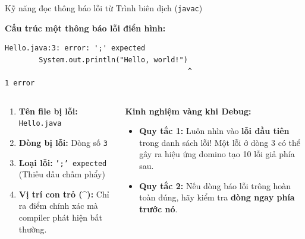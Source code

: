 \documentclass[aspectratio=169, 10pt]{beamer}
\begin{document}
\begin{frame}[fragile]{Kỹ năng đọc thông báo lỗi từ Trình biên dịch (\texttt{javac})}
  \begin{block}{\textbf{Cấu trúc một thông báo lỗi điển hình:}}
    \begin{lstlisting}[style=terminalStyle]
Hello.java:3: error: ';' expected
        System.out.println("Hello, world!")
                                           ^
1 error
    \end{lstlisting}
  \end{block}

  \begin{columns}
    \begin{tcolorbox}[colback=white,colframe=UniBlue,title=\textbf{Các thành phần của thông báo lỗi}]
      \small
      \begin{enumerate}
        \item \textbf{Tên file bị lỗi:} \texttt{Hello.java}
        \item \textbf{Dòng bị lỗi:} Dòng số \texttt{3}
        \item \textbf{Loại lỗi:} \texttt{';' expected} (Thiếu dấu chấm phẩy)
        \item \textbf{Vị trí con trỏ (\^{}):} Chỉ ra điểm chính xác mà compiler phát hiện bất thường.
      \end{enumerate}
    \end{tcolorbox}

    \begin{exampleblock}{\textbf{Kinh nghiệm vàng khi Debug:}}
      \begin{itemize}\small
        \item \textbf{Quy tắc 1:} Luôn nhìn vào \textbf{lỗi đầu tiên} trong danh sách lỗi! Một lỗi ở dòng 3 có thể gây ra hiệu ứng domino tạo 10 lỗi giả phía sau.
        \item \textbf{Quy tắc 2:} Nếu dòng báo lỗi trông hoàn toàn đúng, hãy kiểm tra \textbf{dòng ngay phía trước nó}.
      \end{itemize}
    \end{exampleblock}
  \end{columns}
\end{frame}
\end{document}

